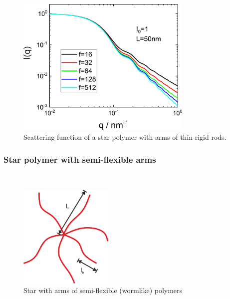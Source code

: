 \begin{figure}[htb]
\begin{center}
\includegraphics[width=0.75\textwidth]{../images/form_factor/stars/StarRigidRodsIQ.png}
\end{center}
\caption{Scattering function of a star polymer with arms of thin rigid rods.} \label{fig:StarRigidRods_Iq}
\end{figure}

\clearpage
\subsubsection{Star polymer with semi-flexible arms}
\label{sect:StarSemiflexible}~\\

\begin{figure}[htb]
\begin{center}
\includegraphics[width=0.4\textwidth]{semiflexiple_polymer_star.png}
\end{center}
\caption{Star with arms of semi-flexible (wormlike) polymers} \label{fig:semiflexiple_polymer_star}
\end{figure}

